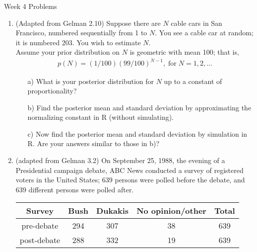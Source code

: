 \documentclass[10pt,a4paper]{article}
\author{Patrick Lam}
\begin{document}
\begin{center}
\begin{Large}Week 4 Problems\end{Large}
\end{center}
\bigskip
\begin{enumerate}

\item (Adapted from Gelman 2.10) Suppose there are $N$ cable cars in San Francisco, numbered sequentially from 1 to $N$.  You see a cable car at random; it is numbered 203.  You wish to estimate $N$. \\

Assume your prior distribution on $N$ is geometric with mean 100; that is,
\begin{eqnarray*}
p(N) = (1/100)(99/100)^{N-1}, \; \mathrm{for} \; N = 1,2,\dots
\end{eqnarray*}

\begin{itemize}
\item[a)] What is your posterior distribution for $N$ up to a constant of proportionality?   
\item[b)] Find the posterior mean and standard deviation by approximating the normalizing constant in R (without simulating). 
\item[c)] Now find the posterior mean and standard deviation by simulation in R.  Are your answers similar to those in b)?
\end{itemize}

\bigskip

\item (adapted from Gelman 3.2) On September 25, 1988, the evening of a Presidential campaign debate, ABC News conducted a survey of registered voters in the United States; 639 persons were polled before the debate, and 639 different persons were polled after.  \\

\begin{table}[!htp]
\begin{center}
\begin{tabular}{ccccc}
Survey & Bush & Dukakis & No opinion/other & Total \\
\hline
pre-debate & 294 & 307 & 38 & 639 \\
post-debate & 288 & 332 & 19 & 639 \\
\end{tabular}
\end{center}
\end{table}


\end{enumerate}
\end{document}
